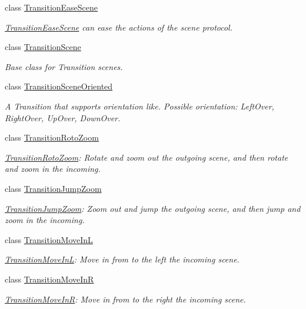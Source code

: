 \begin{DoxyCompactItemize}
class \hyperlink{classTransitionEaseScene}{Transition\+Ease\+Scene}
\begin{DoxyCompactList}\small\item\em \hyperlink{classTransitionEaseScene}{Transition\+Ease\+Scene} can ease the actions of the scene protocol. \end{DoxyCompactList}\item 
class \hyperlink{classTransitionScene}{Transition\+Scene}
\begin{DoxyCompactList}\small\item\em Base class for Transition scenes. \end{DoxyCompactList}\item 
class \hyperlink{classTransitionSceneOriented}{Transition\+Scene\+Oriented}
\begin{DoxyCompactList}\small\item\em A Transition that supports orientation like. Possible orientation\+: Left\+Over, Right\+Over, Up\+Over, Down\+Over. \end{DoxyCompactList}\item 
class \hyperlink{classTransitionRotoZoom}{Transition\+Roto\+Zoom}
\begin{DoxyCompactList}\small\item\em \hyperlink{classTransitionRotoZoom}{Transition\+Roto\+Zoom}\+: Rotate and zoom out the outgoing scene, and then rotate and zoom in the incoming. \end{DoxyCompactList}\item 
class \hyperlink{classTransitionJumpZoom}{Transition\+Jump\+Zoom}
\begin{DoxyCompactList}\small\item\em \hyperlink{classTransitionJumpZoom}{Transition\+Jump\+Zoom}\+: Zoom out and jump the outgoing scene, and then jump and zoom in the incoming. \end{DoxyCompactList}\item 
class \hyperlink{classTransitionMoveInL}{Transition\+Move\+InL}
\begin{DoxyCompactList}\small\item\em \hyperlink{classTransitionMoveInL}{Transition\+Move\+InL}\+: Move in from to the left the incoming scene. \end{DoxyCompactList}\item 
class \hyperlink{classTransitionMoveInR}{Transition\+Move\+InR}
\begin{DoxyCompactList}\small\item\em \hyperlink{classTransitionMoveInR}{Transition\+Move\+InR}\+: Move in from to the right the incoming scene. \end{DoxyCompactList}\item 

\end{DoxyCompactItemize}
